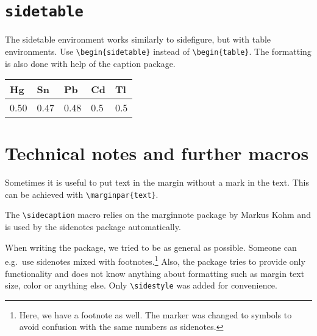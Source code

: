\documentclass{book}
\begin{document}
\section{\texttt{sidetable}}
The sidetable environment works similarly to sidefigure, but with table environments. Use \verb+\begin{sidetable}+ instead of \verb+\begin{table}+. The formatting is also done with help of the caption package.
\begin{sidetable}
  \centering
  \begin{tabular}{lllll}
  \hline
     Hg&Sn&Pb&Cd&Tl \\
     \hline
    0.50&0.47&0.48&0.5&0.5\\
  \end{tabular}
  \caption{This is a table in the margin}
\end{sidetable}

\section{Technical notes and further macros} 
Sometimes it is useful to put text in the margin without a mark in the text. This can be achieved with \verb+\marginpar{text}+. 

The \verb+\sidecaption+ macro relies on the marginnote package by Markus Kohm and is used by the sidenotes package automatically.

When writing the package, we tried to be as general as possible. Someone can e.g.\ use sidenotes mixed with footnotes.\footnote{Here, we have a footnote as well. The marker was changed to symbols to avoid confusion with the same numbers as sidenotes.} Also, the package tries to provide only functionality and does not know anything about formatting such as margin text size, color or anything else. Only \verb+\sidestyle+ was added for convenience. 
\end{document}
